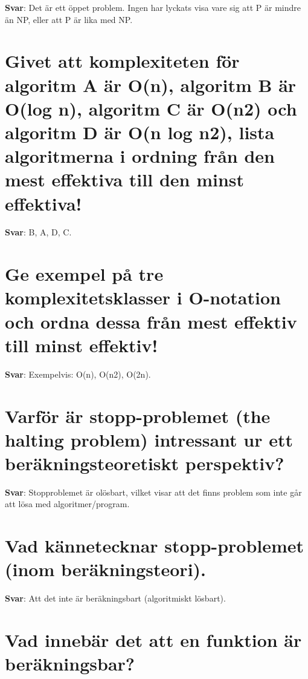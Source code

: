 \documentclass[a4paper,11pt,oneside]{book}
\begin{document}
\begin{sloppypar}
\label{q:336:sa:sv:True}

\textbf{Svar}: Det \"ar ett \"oppet problem. Ingen har lyckats visa vare sig att P \"ar mindre \"an NP, eller att P \"ar lika med NP.



\section{Givet att komplexiteten f\"or algoritm A \"ar O(n), algoritm B \"ar O(log n), algoritm C \"ar O(n2) och algoritm D \"ar O(n log n2), lista algoritmerna i ordning fr\r{a}n den mest effektiva till den minst effektiva!}

\label{q:337:sa:sv:True}

\textbf{Svar}: B, A, D, C.



\section{Ge exempel p\r{a} tre komplexitetsklasser i O-notation och ordna dessa fr\r{a}n mest effektiv till minst effektiv!}

\label{q:338:sa:sv:True}

\textbf{Svar}: Exempelvis: O(n), O(n2), O(2n).



\section{Varf\"or \"ar stopp-problemet (the halting problem) intressant ur ett ber\"akningsteoretiskt perspektiv?}

\label{q:339:sa:sv:True}

\textbf{Svar}: Stopproblemet \"ar ol\"osbart, vilket visar att det finns problem som inte g\r{a}r att l\"osa med algoritmer/program.



\section{Vad k\"annetecknar stopp-problemet (inom ber\"akningsteori).}

\label{q:340:sa:sv:True}

\textbf{Svar}: Att det inte \"ar ber\"akningsbart (algoritmiskt l\"osbart).



\section{Vad inneb\"ar det att en funktion \"ar ber\"akningsbar?}


\end{sloppypar}
\end{document}
